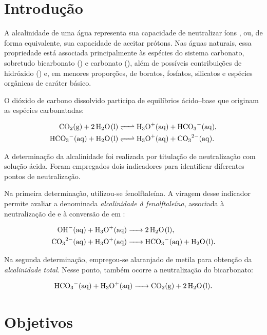 \documentclass[a4paper,12pt]{article}
\begin{document}
\section{Introdução}

A alcalinidade de uma água representa sua capacidade de neutralizar íons
, ou, de forma equivalente, sua capacidade de aceitar prótons.
Nas águas naturais, essa propriedade está associada principalmente às
espécies do sistema carbonato, sobretudo bicarbonato
() e carbonato (), além de possíveis contribuições de
hidróxido () e, em menores proporções, de boratos, fosfatos,
silicatos e espécies orgânicas de caráter básico.

O dióxido de carbono dissolvido participa de equilíbrios ácido--base que
originam as espécies carbonatadas:

\begin{align}
\ce{CO2(g) + 2H2O(l)}
&\ce{<=> H3O+(aq) + HCO3-(aq)},\\
\ce{HCO3-(aq) + H2O(l)}
&\ce{<=> H3O+(aq) + CO3^2-(aq)}.
\end{align}

A determinação da alcalinidade foi realizada por titulação de neutralização
com solução ácida. Foram empregados dois indicadores para identificar
diferentes pontos de neutralização.

Na primeira determinação, utilizou-se fenolftaleína. A viragem desse
indicador permite avaliar a denominada \textit{alcalinidade à
fenolftaleína}, associada à neutralização de  e à conversão de
 em :

\begin{align}
\ce{OH-(aq) + H3O+(aq)}
&\ce{-> 2H2O(l)},\\
\ce{CO3^2-(aq) + H3O+(aq)}
&\ce{-> HCO3-(aq) + H2O(l)}.
\end{align}

Na segunda determinação, empregou-se alaranjado de metila para obtenção da
\textit{alcalinidade total}. Nesse ponto, também ocorre a neutralização do
bicarbonato:

\begin{equation}
\ce{HCO3-(aq) + H3O+(aq) -> CO2(g) + 2H2O(l)}.
\end{equation}

\section{Objetivos}
\end{document}
